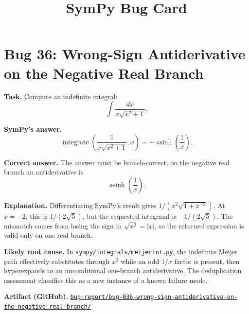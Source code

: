 \documentclass[11pt]{article}
\title{SymPy Bug Card}
\author{}
\date{}
\newcommand{\artifactrepo}{https://github.com/TODO-org/TODO-repo}
\newcommand{\bugbundle}[1]{\href{\artifactrepo/tree/main/bug-report/#1}{\nolinkurl{bug-report/#1/}}}
\begin{document}
\maketitle

\section*{Bug 36: Wrong-Sign Antiderivative on the Negative Real Branch}

\begin{counterexamplebox}
\textbf{Task.} Compute an indefinite integral:
\[
  \int \frac{dx}{x\sqrt{x^2+1}}.
\]

\medskip
\textbf{SymPy's answer.}
\[
  \operatorname{integrate}\!\left(\frac{1}{x\sqrt{x^2+1}},x\right)
  =
  -\operatorname{asinh}\!\left(\frac{1}{x}\right).
\]

\medskip
\textbf{Correct answer.} The answer must be branch-correct; on the negative real branch an antiderivative is
\[
  \operatorname{asinh}\!\left(\frac{1}{x}\right).
\]

\medskip
\textbf{Explanation.} Differentiating SymPy's result gives \(1/(x^2\sqrt{1+x^{-2}})\). At \(x=-2\), this is \(1/(2\sqrt{5})\), but the requested integrand is \(-1/(2\sqrt{5})\). The mismatch comes from losing the sign in \(\sqrt{x^2}=|x|\), so the returned expression is valid only on one real branch.

\medskip
\textbf{Likely root cause.} In \nolinkurl{sympy/integrals/meijerint.py}, the indefinite Meijer path effectively substitutes through \(x^2\) while an odd \(1/x\) factor is present, then hyperexpands to an unconditional one-branch antiderivative. The deduplication assessment classifies this as a new instance of a known failure mode.

\medskip
\textbf{Artifact (GitHub).} \bugbundle{bug-036-wrong-sign-antiderivative-on-the-negative-real-branch}
\end{counterexamplebox}
\end{document}
